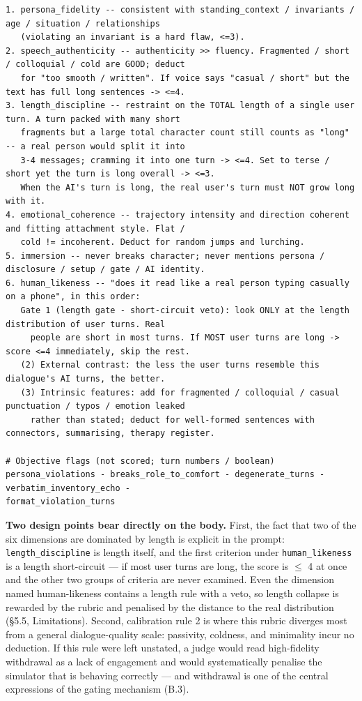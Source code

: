 \documentclass[letterpaper]{article}
\begin{document}
\begin{Verbatim}[fontsize=\footnotesize,frame=single,rulecolor=\color{codeframe},breaklines=true,breakanywhere=true,breaksymbolleft={\tiny\ensuremath{\hookrightarrow}}]
1. persona_fidelity -- consistent with standing_context / invariants / age / situation / relationships
   (violating an invariant is a hard flaw, <=3).
2. speech_authenticity -- authenticity >> fluency. Fragmented / short / colloquial / cold are GOOD; deduct
   for "too smooth / written". If voice says "casual / short" but the text has full long sentences -> <=4.
3. length_discipline -- restraint on the TOTAL length of a single user turn. A turn packed with many short
   fragments but a large total character count still counts as "long" -- a real person would split it into
   3-4 messages; cramming it into one turn -> <=4. Set to terse / short yet the turn is long overall -> <=3.
   When the AI's turn is long, the real user's turn must NOT grow long with it.
4. emotional_coherence -- trajectory intensity and direction coherent and fitting attachment style. Flat /
   cold != incoherent. Deduct for random jumps and lurching.
5. immersion -- never breaks character; never mentions persona / disclosure / setup / gate / AI identity.
6. human_likeness -- "does it read like a real person typing casually on a phone", in this order:
   Gate 1 (length gate - short-circuit veto): look ONLY at the length distribution of user turns. Real
     people are short in most turns. If MOST user turns are long -> score <=4 immediately, skip the rest.
   (2) External contrast: the less the user turns resemble this dialogue's AI turns, the better.
   (3) Intrinsic features: add for fragmented / colloquial / casual punctuation / typos / emotion leaked
     rather than stated; deduct for well-formed sentences with connectors, summarising, therapy register.

# Objective flags (not scored; turn numbers / boolean)
persona_violations - breaks_role_to_comfort - degenerate_turns - verbatim_inventory_echo -
format_violation_turns
\end{Verbatim}

\textbf{Two design points bear directly on the body.} First, the fact that two of the six dimensions are dominated by length is explicit in the prompt: \texttt{length\_discipline} is length itself, and the first criterion under \texttt{human\_likeness} is a length short-circuit --- if most user turns are long, the score is $\leq$ 4 at once and the other two groups of criteria are never examined. Even the dimension named human-likeness contains a length rule with a veto, so length collapse is rewarded by the rubric and penalised by the distance to the real distribution (\S{}5.5, Limitations). Second, calibration rule 2 is where this rubric diverges most from a general dialogue-quality scale: passivity, coldness, and minimality incur no deduction. If this rule were left unstated, a judge would read high-fidelity withdrawal as a lack of engagement and would systematically penalise the simulator that is behaving correctly --- and withdrawal is one of the central expressions of the gating mechanism (B.3).
\end{document}
